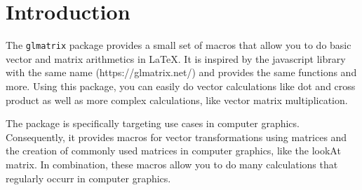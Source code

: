 \section{Introduction}

The \texttt{glmatrix} package provides a small set of macros that allow you to
do basic vector and matrix arithmetics in \LaTeX. It is inspired by the javascript
library with the same name (https://glmatrix.net/) and provides the same functions and more.
Using this package, you can easily do vector calculations like dot and cross
product as well as more complex calculations, like vector matrix multiplication.

The package is specifically targeting use cases in computer graphics.
Consequently, it provides macros for vector transformations using matrices and
the creation of commonly used matrices in computer graphics, like the lookAt matrix.
In combination, these macros allow you to do many calculations that regularly occurr in computer graphics.

\clearpage
